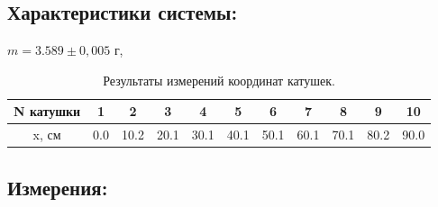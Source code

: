 \documentclass[
	a4paper, %
	12pt, %
]{article}
\begin{document}
	\subsection{Характеристики системы:}
	
	$m = 3.589\pm 0,005$ г,\\
	
	\begin{table}[h]
		\centering
		\begin{tabular}{|c|c|c|c|c|c|c|c|c|c|c|}
			\hline
			N катушки & 1 & 2 & 3 & 4 & 5 & 6 & 7 & 8 & 9 & 10  \\
			\hline
			x, см & 0.0 & 10.2 & 20.1 & 30.1 & 40.1 & 50.1 & 60.1 & 70.1 & 80.2 & 90.0 \\
			\hline
		\end{tabular}
		\caption{Результаты измерений координат катушек.}
		\label{table:1}
	\end{table}
	
	\subsection{Измерения:}

	
	
\end{document}
